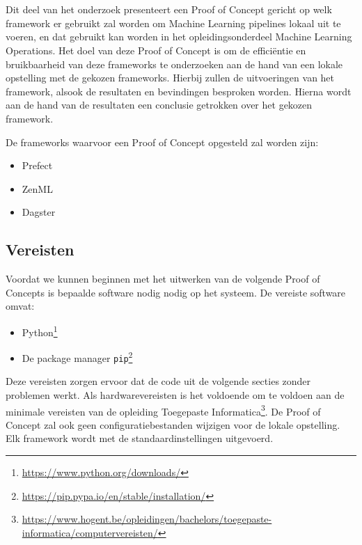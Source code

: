 \chapter{}%
\label{ch:PoC}

Dit deel van het onderzoek presenteert een Proof of Concept gericht op welk framework er gebruikt zal worden om Machine Learning pipelines lokaal uit te voeren, en dat gebruikt kan worden in het opleidingsonderdeel Machine Learning Operations.
Het doel van deze Proof of Concept is om de efficiëntie en bruikbaarheid van deze frameworks te onderzoeken aan de hand van een lokale opstelling met de gekozen frameworks. Hierbij zullen de uitvoeringen van het framework, alsook de resultaten en bevindingen besproken worden.
Hierna wordt aan de hand van de resultaten een conclusie getrokken over het gekozen framework.

De frameworks waarvoor een Proof of Concept opgesteld zal worden zijn:
\begin{itemize}
    \item Prefect
    \item ZenML
    \item Dagster
\end{itemize}

\section{Vereisten}

Voordat we kunnen beginnen met het uitwerken van de volgende Proof of Concepts is bepaalde software nodig nodig op het systeem. De vereiste software omvat:

\begin{itemize}
    \item Python\footnote{\url{https://www.python.org/downloads/}}
    \item De package manager \texttt{pip}\footnote{\url{https://pip.pypa.io/en/stable/installation/}}
\end{itemize}

Deze vereisten zorgen ervoor dat de code uit de volgende secties zonder problemen werkt. Als hardwarevereisten is het voldoende om te voldoen aan de minimale vereisten van de opleiding Toegepaste Informatica\footnote{\url{https://www.hogent.be/opleidingen/bachelors/toegepaste-informatica/computervereisten/}}. De Proof of Concept zal ook geen configuratiebestanden wijzigen voor de lokale opstelling. Elk framework wordt met de standaardinstellingen uitgevoerd.

